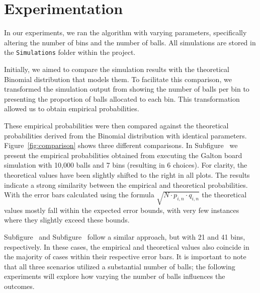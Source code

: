\documentclass[a4paper, 11pt]{article}
\begin{document}
\section{Experimentation}

In our experiments, we ran the algorithm with varying parameters, specifically altering the number of bins and the number of balls. All simulations are stored in the \texttt{Simulations} folder within the project.

Initially, we aimed to compare the simulation results with the theoretical Binomial distribution that models them. To facilitate this comparison, we transformed the simulation output from showing the number of balls per bin to presenting the proportion of balls allocated to each bin. This transformation allowed us to obtain empirical probabilities.

These empirical probabilities were then compared against the theoretical probabilities derived from the Binomial distribution with identical parameters. Figure~\ref{fig:comparison} shows three different comparisons. In Subfigure~ we present the empirical probabilities obtained from executing the Galton board simulation with 10,000 balls and 7 bins (resulting in 6 choices). For clarity, the theoretical values have been slightly shifted to the right in all plots. The results indicate a strong similarity between the empirical and theoretical probabilities. With the error bars calculated using the formula $\sqrt{N \cdot p_{i,n}\cdot q_{i,n}}$ the theoretical values mostly fall within the expected error bounds, with very few instances where they slightly exceed these bounds.

Subfigure~ and Subfigure~ follow a similar approach, but with 21 and 41 bins, respectively. In these cases, the empirical and theoretical values also coincide in the majority of cases within their respective error bars. It is important to note that all three scenarios utilized a substantial number of balls; the following experiments will explore how varying the number of balls influences the outcomes.
\end{document}

